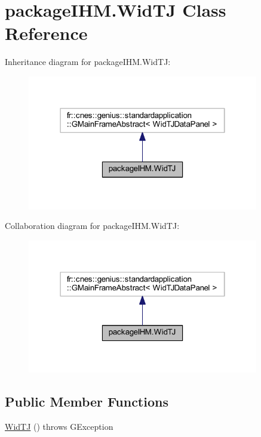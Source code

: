 \hypertarget{classpackage_i_h_m_1_1_wid_t_j}{}\section{package\+I\+H\+M.\+Wid\+TJ Class Reference}
\label{classpackage_i_h_m_1_1_wid_t_j}


Inheritance diagram for package\+I\+H\+M.\+Wid\+TJ\+:
\nopagebreak
\begin{figure}[H]
\begin{center}
\leavevmode
\includegraphics[width=286pt]{classpackage_i_h_m_1_1_wid_t_j__inherit__graph}
\end{center}
\end{figure}


Collaboration diagram for package\+I\+H\+M.\+Wid\+TJ\+:
\nopagebreak
\begin{figure}[H]
\begin{center}
\leavevmode
\includegraphics[width=286pt]{classpackage_i_h_m_1_1_wid_t_j__coll__graph}
\end{center}
\end{figure}
\subsection*{Public Member Functions}
\begin{DoxyCompactItemize}
\item 
\mbox{\hyperlink{classpackage_i_h_m_1_1_wid_t_j_a91eaa9ba3a133dee647a5055d255c2d5}{Wid\+TJ}} ()  throws G\+Exception 
\end{DoxyCompactItemize}
